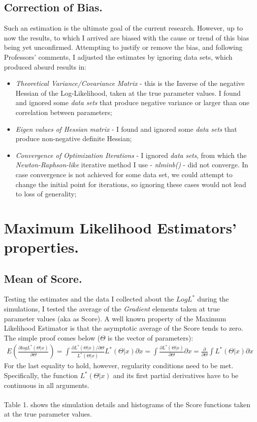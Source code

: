 \documentclass{article}
\begin{document}
\subsection{Correction of Bias.} Such an estimation is the ultimate goal of the current research. However, up to now the results, to which I arrived are biased with the cause or trend of this bias being yet unconfirmed. Attempting to justify or remove the bias, and following Professors' comments, I adjusted the estimates by ignoring data sets, which produced absurd results in: 
\begin{itemize}
\item \textit{Theoretical Variance/Covariance Matrix} - this is the Inverse of the negative Hessian of the Log-Likelihood, taken at the true parameter values. I found and ignored some \textit{data sets} that produce negative variance or larger than one correlation between parameters;
\item \textit{Eigen values of Hessian matrix} - I found and ignored some \textit{data sets} that produce non-negative definite Hessian;
\item \textit{Convergence of Optimization Iterations} - I ignored \textit{data sets}, from which the \textit{Newton-Raphson-like} iterative method I use - \textit{nlminb()} - did not converge. In case convergence is not achieved for some data set, we could attempt to change the initial point for iterations, so ignoring these cases would not lead to loss of generality;
\end{itemize}
\section{Maximum Likelihood Estimators' properties.}
\subsection{Mean of Score.} Testing the estimates and the data I collected about the $Log L^*$ during the simulations, I tested the average of the \textit{Gradient} elements taken at true parameter values (aka as Score). A well known property of the Maximum Likelihood Estimator is that the asymptotic average of the Score tends to zero. The simple proof comes below ($\Theta$ is the vector of parameters):\\
\begin{eqnarray}
E(\frac{\partial log L^*(\Theta | x)}{\partial \Theta}) = \int \frac{\partial L^*(\Theta | x)/\partial \Theta}{L^*(\Theta | x)}L^*(\Theta | x)\partial x = \int \frac{\partial L^*(\Theta | x)}{\partial \Theta} \partial x = \frac{\partial}{\partial \Theta} \int L^*(\Theta | x) \partial x 
\end{eqnarray} 
For the last equality to hold, however, regularity conditions need to be met. Specifically, the function $L^*(\Theta | x)$ and its first partial derivatives have to be continuous in all arguments.\\ 
\\Table 1. shows the simulation details and histograms of the Score functions taken at the true parameter values. 
\end{document}
